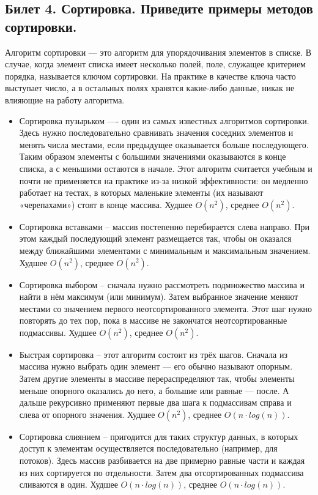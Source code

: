 \documentclass[a4paper, 12pt]{article}
\begin{document}
	\subsection*{Билет 4.  Сортировка. Приведите примеры методов сортировки.}
	Алгоритм сортировки — это алгоритм для упорядочивания элементов в списке. В случае, когда элемент списка имеет несколько полей, поле, служащее критерием порядка, называется ключом сортировки. На практике в качестве ключа часто выступает число, а в остальных полях хранятся какие-либо данные, никак не влияющие на работу алгоритма.
	\begin{itemize}
		\item Сортировка пузырьком —- один из самых известных алгоритмов сортировки. Здесь нужно последовательно сравнивать значения соседних элементов и менять числа местами, если предыдущее оказывается больше последующего. Таким образом элементы с большими значениями оказываются в конце списка, а с меньшими остаются в начале.
		Этот алгоритм считается учебным и почти не применяется на практике из-за низкой эффективности: он медленно работает на тестах, в которых маленькие элементы (их называют «черепахами») стоят в конце массива. Худшее $O(n^{2})$, среднее $O(n^{2})$.
		
		\item Сортировка вставками -- массив постепенно перебирается слева направо. При этом каждый последующий элемент размещается так, чтобы он оказался между ближайшими элементами с минимальным и максимальным значением. Худшее $O(n^{2})$, среднее $O(n^{2})$.
		
		\item Сортировка выбором -- сначала нужно рассмотреть подмножество массива и найти в нём максимум (или минимум). Затем выбранное значение меняют местами со значением первого неотсортированного элемента. Этот шаг нужно повторять до тех пор, пока в массиве не закончатся неотсортированные подмассивы. Худшее $O(n^{2})$, среднее $O(n^{2})$.
		
		\item Быстрая сортировка -- этот алгоритм состоит из трёх шагов. Сначала из массива нужно выбрать один элемент — его обычно называют опорным. Затем другие элементы в массиве перераспределяют так, чтобы элементы меньше опорного оказались до него, а большие или равные — после. А дальше рекурсивно применяют первые два шага к подмассивам справа и слева от опорного значения. Худшее $O(n^{2})$, среднее $O(n \cdot log(n))$.
		
		\item Сортировка слиянием -- пригодится для таких структур данных, в которых доступ к элементам осуществляется последовательно (например, для потоков). Здесь массив разбивается на две примерно равные части и каждая из них сортируется по отдельности. Затем два отсортированных подмассива сливаются в один. Худшее $O(n \cdot log(n))$, среднее $O(n \cdot log(n))$.
	\end{itemize}
\end{document}
